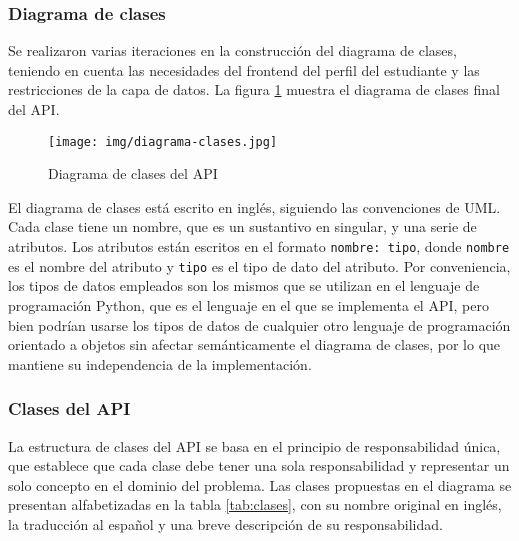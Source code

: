 \subsubsection{Diagrama de clases}

Se realizaron varias iteraciones en la construcción del diagrama de clases, teniendo en cuenta las necesidades del \gls{frontend} del perfil del estudiante y las restricciones de la capa de datos. La figura \ref{fig:diagrama_clases} muestra el diagrama de clases final del \gls{API}.

\begin{figure}[h]
	\centering
	\texttt{[image: img/diagrama-clases.jpg]}
	\caption{Diagrama de clases del \gls{API}}
	\label{fig:diagrama_clases}
\end{figure}

El diagrama de clases está escrito en inglés, siguiendo las convenciones de \gls{UML}. Cada clase tiene un nombre, que es un sustantivo en singular, y una serie de atributos. Los atributos están escritos en el formato \lstinline|nombre: tipo|, donde \lstinline|nombre| es el nombre del atributo y \lstinline|tipo| es el tipo de dato del atributo. Por conveniencia, los tipos de datos empleados son los mismos que se utilizan en el lenguaje de programación \gls{Python}, que es el lenguaje en el que se implementa el \gls{API}, pero bien podrían usarse los tipos de datos de cualquier otro lenguaje de programación orientado a objetos sin afectar semánticamente el diagrama de clases, por lo que mantiene su independencia de la implementación.

\subsubsection{Clases del API}

La estructura de clases del \gls{API} se basa en el principio de responsabilidad única, que establece que cada clase debe tener una sola responsabilidad y representar un solo concepto en el dominio del problema. Las clases propuestas en el diagrama se presentan alfabetizadas en la tabla \ref{tab:clases}, con su nombre original en inglés, la traducción al español y una breve descripción de su responsabilidad.

